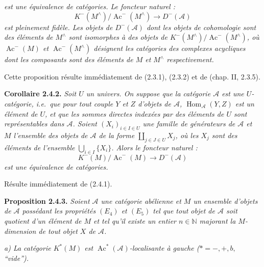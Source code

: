 \clearpage
{}%
\begingroup\small\setlength{\parskip}{0pt}\setlength{\emergencystretch}{1.5em}
\setlength{\abovedisplayskip}{4pt plus 2pt minus 2pt}%
\setlength{\belowdisplayskip}{4pt plus 2pt minus 2pt}%

\noindent\textit{est une équivalence de catégories. Le foncteur naturel :}
\[
K^{-}(M^{\wedge})/\operatorname{Ac}^{-}(M^{\wedge})
\longrightarrow D^{-}(\mathcal A)
\]
\noindent\textit{est pleinement fidèle. Les objets de $D^{-}(\mathcal A)$
dont les objets de cohomologie sont des éléments de $M^{\wedge}$ sont
isomorphes à des objets de
$K^{-}(M^{\wedge})/\operatorname{Ac}^{-}(M^{\wedge})$, où
$\operatorname{Ac}^{-}(M)$ et $\operatorname{Ac}^{-}(M^{\wedge})$
désignent les catégories des complexes acycliques dont les composants sont
des éléments de $M$ et $M^{\wedge}$ respectivement.}

Cette proposition résulte immédiatement de (2.3.1), (2.3.2) et de
(chap. II, 2.3.5).

\medskip\noindent\textbf{Corollaire 2.4.2.}\quad
\textit{Soit $U$ un univers. On suppose que la catégorie $\mathcal A$ est
une $U$-catégorie, i.e.\ que pour tout couple $Y$ et $Z$ d'objets de
$\mathcal A$, $\operatorname{Hom}_{\mathcal A}(Y,Z)$ est un élément de
$U$, et que les sommes directes indexées par des éléments de $U$ sont
représentables dans $\mathcal A$. Soient $(X_i)_{i\in I\in U}$ une famille
de générateurs de $\mathcal A$ et $M$ l'ensemble des objets de $\mathcal A$
de la forme $\coprod_{j\in J\in U}X_j$, où les $X_j$ sont des éléments de
l'ensemble $\bigcup_{i\in I}\{X_i\}$. Alors le foncteur naturel :}
\[
K^{-}(M)/\operatorname{Ac}^{-}(M)\longrightarrow D^{-}(\mathcal A)
\]
\noindent\textit{est une équivalence de catégories.}

Résulte immédiatement de (2.4.1).

\medskip\noindent\textbf{Proposition 2.4.3.}\quad
\textit{Soient $\mathcal A$ une catégorie abélienne et $M$ un ensemble
d'objets de $\mathcal A$ possédant les propriétés $(E_4)$ et $(E_5)$ tel
que tout objet de $\mathcal A$ soit quotient d'un élément de $M$ et tel
qu'il existe un entier $n\in\mathbb N$ majorant la $M$-dimension de tout
objet $X$ de $\mathcal A$.}

\noindent\textit{a) La catégorie $K^{*}(M)$ est
$\operatorname{Ac}^{*}(\mathcal A)$-localisante à gauche
($*=-,+,b,{}$ ``vide'').}

